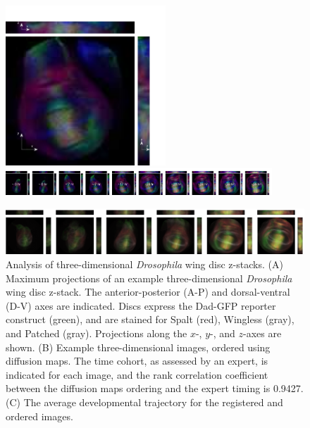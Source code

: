 \documentclass[twocolumn, 10pt]{article}
\begin{document}
\begin{figure}[t]
\includegraphics[width=6cm]{wing_disc_example}
%
\hfill
%
\includegraphics[width=10cm]{wing_disc_ordered}

\vspace{0.25cm}
\includegraphics[width=17.5cm]{wing_disc_average}

\caption{Analysis of three-dimensional {\em Drosophila} wing disc z-stacks. (A) Maximum projections of an example three-dimensional {\em Drosophila} wing disc z-stack. The anterior-posterior (A-P) and dorsal-ventral (D-V) axes are indicated. Discs express the Dad-GFP reporter construct (green), and are stained for Spalt (red), Wingless (gray), and Patched (gray). Projections along the $x$-, $y$-, and $z$-axes are shown. (B) Example three-dimensional images, ordered using diffusion maps. The time cohort, as assessed by an expert, is indicated for each image, and the rank correlation coefficient between the diffusion maps ordering and the expert timing is 0.9427. (C) The average developmental trajectory for the registered and ordered images. }
\label{fig:wing_disc}
\end{figure}

%
%
\end{document}
